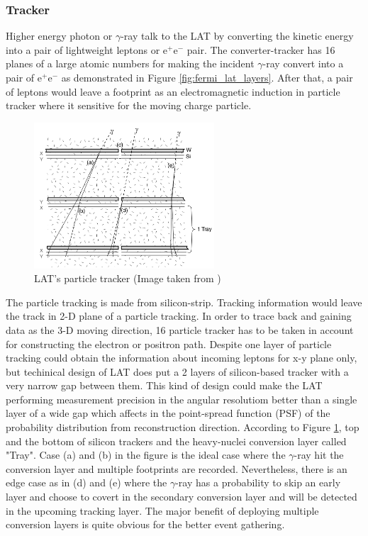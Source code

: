 \subsubsection{Tracker}
Higher energy photon or $\gamma$-ray talk to the LAT by converting the
kinetic energy into a pair of lightweight leptons or e$^{+}$e$^{-}$ pair.
The converter-tracker has 16 planes of a large atomic numbers for 
making the incident $\gamma$-ray convert into a pair of e$^{+}$e$^{-}$
as demonstrated in Figure \ref{fig:fermi_lat_layers}. After that, 
a pair of leptons would leave a footprint as an electromagnetic induction 
in particle tracker where it sensitive for the moving charge particle.

\begin{figure}[h!]
    \centering
    \includegraphics[width=0.6\textwidth]{content/background/figures/fermi_tracker.png}
    \caption{LAT's particle tracker (Image taken from \cite{FermiLAT})}
    \label{fig:fermi_tracker}
\end{figure}

The particle tracking is made from silicon-strip. Tracking information 
would leave the track in 2-D plane of a particle tracking. In order to
trace back and gaining data as the 3-D moving direction, 16 particle 
tracker has to be taken in account for constructing the electron 
or positron path.
Despite one layer of particle tracking could obtain 
the information about incoming leptons for x-y plane only, but techinical 
design of LAT does put a 2 layers of silicon-based tracker with a very 
narrow gap between them. This kind of design could make the LAT performing 
measurement precision in the angular resolutiom better than a single 
layer of a wide gap which affects in the point-spread function (PSF)
of the probability distribution from reconstruction direction.
According to Figure \ref{fig:fermi_tracker}, top and the bottom of
silicon trackers and the heavy-nuclei conversion layer called "Tray".
Case (a) and (b) in the figure is the ideal case where the $\gamma$-ray
hit the conversion layer and multiple footprints are recorded.
Nevertheless, there is an edge case as in (d) and (e) where the $\gamma$-ray
has a probability to skip an early layer and choose to covert in the 
secondary conversion layer and will be detected in the upcoming 
tracking layer. The major benefit of deploying multiple conversion 
layers is quite obvious for the better event gathering.


